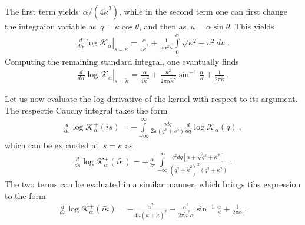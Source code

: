 \documentclass[preprint,aps,eqsecnum]{revtex4-1}
\newcommand{\fplus}[1]{{#1}^{+}}
\begin{document}
The first term yields~$\alpha /(4{\tilde\kappa}^3)$, while in
the second term one can first change the integraion variable
as~$q = {\tilde\kappa}\cos\theta$, and then as~$u = \alpha \sin\theta$.
This yields
\begin{align}
  \left.\frac{d}{d\alpha}\log \mathcal{K}_{\alpha}
  \right|_{s = {\tilde\kappa}}
  = \frac{\alpha}{4{\tilde\kappa}^2} + \frac{1}{\pi\alpha^2 {\tilde\kappa}}
  \int\limits_{0}^{\alpha} \sqrt{\kappa^2 - u^2} du\ . 
\end{align}
Computing the remaining standard integral, one evantually finds
\begin{align}
  \label{eq:appA-1st-half}
  \left.\frac{d}{d\alpha}\log \mathcal{K}_{\alpha}
  \right|_{s = {\tilde\kappa}}
  = \frac{\alpha}{4{\tilde\kappa}^2}
  + \frac{\kappa^2}{2\pi\alpha{\tilde\kappa}^2} \sin^{-1}\frac{\alpha}{\kappa}
  + \frac{1}{2\pi{\tilde\kappa}}\ . 
\end{align}

Let us now evaluate the log-derivative of the kernel with respect
to its argument. The respectie Cauchy integral takes the form
\begin{align}
  \frac{d}{ds} \log \fplus{\mathcal{K}}_{\alpha}(is)
  = -\int\limits_{-\infty}^{\infty} \frac{qdq}{2\pi (q^2 + s^2)}
  \frac{d}{dq} \log \mathcal{K}_\alpha(q)\ ,  
\end{align}
which can be expanded at~$s = {\tilde\kappa}$ as
\begin{align}
  \frac{d}{ds} \log \fplus{\mathcal{K}}_{\alpha}(i{\tilde\kappa})
  = - \frac{\alpha}{2\pi}
  \int\limits_{-\infty}^{\infty}
  \frac{q^2 dq \left[\alpha + \sqrt{q^2 + \kappa^2}\right]}{
     (q^2 + {\tilde \kappa}^2)^2 (q^2 + \kappa^2)
  }\ .
\end{align}
The two terms can be evaluated in a similar manner, which brings
tihs expression to the form
\begin{align}
  \label{eq:appA-2nd-half}
  \frac{d}{ds} \log \fplus{\mathcal{K}}_{\alpha}(i{\tilde\kappa})
  = - \frac{\alpha^2}{4{\tilde \kappa} (\kappa + {\tilde\kappa})^2}
  - \frac{\kappa^2}{2\pi{\tilde\kappa}^2 \alpha}
  \sin^{-1}\frac{\alpha}{\kappa} + \frac{1}{2\pi\alpha}\ . 
\end{align}
\end{document}
